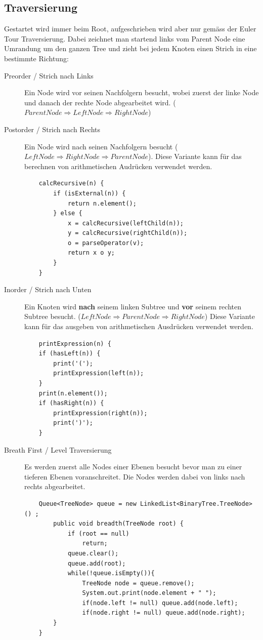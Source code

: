 \subsection{Traversierung}
Gestartet wird immer beim Root, aufgeschrieben wird aber nur gemäss der Euler Tour Traversierung. Dabei zeichnet man startend links vom Parent Node eine Umrandung um den ganzen Tree und zieht bei jedem Knoten einen Strich in eine bestimmte Richtung:
\begin{description}
	\item[Preorder / Strich nach Links] Ein Node wird vor seinen Nachfolgern besucht, wobei zuerst der linke Node und danach der rechte Node abgearbeitet wird. ($Parent Node \Rightarrow Left Node \Rightarrow Right Node$)
	\item[Postorder / Strich nach Rechts] Ein Node wird nach seinen Nachfolgern besucht ($Left Node \Rightarrow Right Node \Rightarrow Parent Node$). Diese Variante kann für das berechnen von arithmetischen Audrücken verwendet werden.
	\begin{lstlisting}
	calcRecursive(n) {
		if (isExternal(n)) {
			return n.element();
		} else {
			x = calcRecursive(leftChild(n));
			y = calcRecursive(rightChild(n));
			o = parseOperator(v);
			return x o y;
		}
	}
	\end{lstlisting}
	\item[Inorder / Strich nach Unten] Ein Knoten wird \textbf{nach} seinem linken Subtree und \textbf{vor} seinem rechten Subtree besucht.
	($Left Node \Rightarrow Parent Node \Rightarrow Right Node$) Diese Variante kann für das ausgeben von arithmetischen Ausdrücken verwendet werden.
	\begin{lstlisting}
	printExpression(n) {
	if (hasLeft(n)) {
		print('(');
		printExpression(left(n));
	}
	print(n.element());
	if (hasRight(n)) {
		printExpression(right(n));
		print(')');
	}
	\end{lstlisting}
	\item[Breath First / Level Traversierung] Es werden zuerst alle Nodes einer Ebenen besucht bevor man zu einer tieferen Ebenen voranschreitet. Die Nodes werden dabei von links nach rechts abgearbeitet.
	\begin{lstlisting}
	Queue<TreeNode> queue = new LinkedList<BinaryTree.TreeNode>() ;
		public void breadth(TreeNode root) {
			if (root == null)
				return;
			queue.clear();
			queue.add(root);
			while(!queue.isEmpty()){
				TreeNode node = queue.remove();
				System.out.print(node.element + " ");
				if(node.left != null) queue.add(node.left);
				if(node.right != null) queue.add(node.right);
		}
	}
	\end{lstlisting}
	
\end{description}

